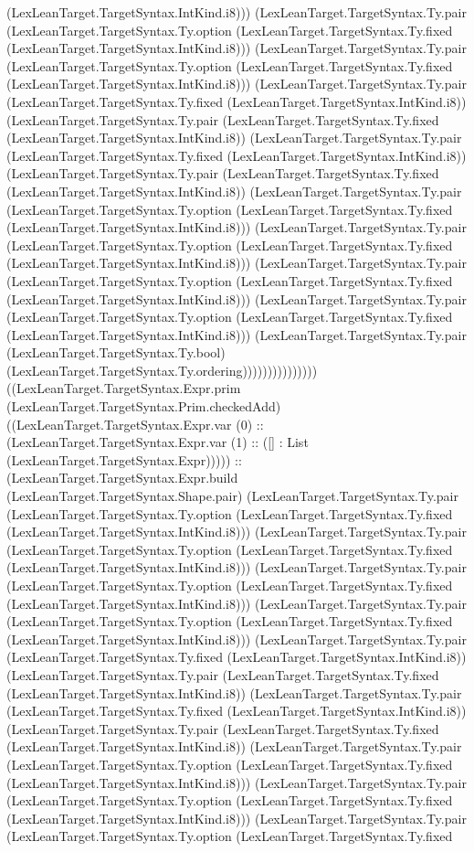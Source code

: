 \documentclass[11pt]{article}
\begin{document}
(LexLeanTarget.TargetSyntax.IntKind.i8))) (LexLeanTarget.TargetSyntax.Ty.pair (LexLeanTarget.TargetSyntax.Ty.option (LexLeanTarget.TargetSyntax.Ty.fixed (LexLeanTarget.TargetSyntax.IntKind.i8))) (LexLeanTarget.TargetSyntax.Ty.pair (LexLeanTarget.TargetSyntax.Ty.option (LexLeanTarget.TargetSyntax.Ty.fixed (LexLeanTarget.TargetSyntax.IntKind.i8))) (LexLeanTarget.TargetSyntax.Ty.pair (LexLeanTarget.TargetSyntax.Ty.fixed (LexLeanTarget.TargetSyntax.IntKind.i8)) (LexLeanTarget.TargetSyntax.Ty.pair (LexLeanTarget.TargetSyntax.Ty.fixed (LexLeanTarget.TargetSyntax.IntKind.i8)) (LexLeanTarget.TargetSyntax.Ty.pair (LexLeanTarget.TargetSyntax.Ty.fixed (LexLeanTarget.TargetSyntax.IntKind.i8)) (LexLeanTarget.TargetSyntax.Ty.pair (LexLeanTarget.TargetSyntax.Ty.fixed (LexLeanTarget.TargetSyntax.IntKind.i8)) (LexLeanTarget.TargetSyntax.Ty.pair (LexLeanTarget.TargetSyntax.Ty.option (LexLeanTarget.TargetSyntax.Ty.fixed (LexLeanTarget.TargetSyntax.IntKind.i8))) (LexLeanTarget.TargetSyntax.Ty.pair (LexLeanTarget.TargetSyntax.Ty.option (LexLeanTarget.TargetSyntax.Ty.fixed (LexLeanTarget.TargetSyntax.IntKind.i8))) (LexLeanTarget.TargetSyntax.Ty.pair (LexLeanTarget.TargetSyntax.Ty.option (LexLeanTarget.TargetSyntax.Ty.fixed (LexLeanTarget.TargetSyntax.IntKind.i8))) (LexLeanTarget.TargetSyntax.Ty.pair (LexLeanTarget.TargetSyntax.Ty.option (LexLeanTarget.TargetSyntax.Ty.fixed (LexLeanTarget.TargetSyntax.IntKind.i8))) (LexLeanTarget.TargetSyntax.Ty.pair (LexLeanTarget.TargetSyntax.Ty.bool) (LexLeanTarget.TargetSyntax.Ty.ordering))))))))))))))) ((LexLeanTarget.TargetSyntax.Expr.prim (LexLeanTarget.TargetSyntax.Prim.checkedAdd) ((LexLeanTarget.TargetSyntax.Expr.var (0) :: (LexLeanTarget.TargetSyntax.Expr.var (1) :: ([] : List (LexLeanTarget.TargetSyntax.Expr))))) :: (LexLeanTarget.TargetSyntax.Expr.build (LexLeanTarget.TargetSyntax.Shape.pair) (LexLeanTarget.TargetSyntax.Ty.pair (LexLeanTarget.TargetSyntax.Ty.option (LexLeanTarget.TargetSyntax.Ty.fixed (LexLeanTarget.TargetSyntax.IntKind.i8))) (LexLeanTarget.TargetSyntax.Ty.pair (LexLeanTarget.TargetSyntax.Ty.option (LexLeanTarget.TargetSyntax.Ty.fixed (LexLeanTarget.TargetSyntax.IntKind.i8))) (LexLeanTarget.TargetSyntax.Ty.pair (LexLeanTarget.TargetSyntax.Ty.option (LexLeanTarget.TargetSyntax.Ty.fixed (LexLeanTarget.TargetSyntax.IntKind.i8))) (LexLeanTarget.TargetSyntax.Ty.pair (LexLeanTarget.TargetSyntax.Ty.option (LexLeanTarget.TargetSyntax.Ty.fixed (LexLeanTarget.TargetSyntax.IntKind.i8))) (LexLeanTarget.TargetSyntax.Ty.pair (LexLeanTarget.TargetSyntax.Ty.fixed (LexLeanTarget.TargetSyntax.IntKind.i8)) (LexLeanTarget.TargetSyntax.Ty.pair (LexLeanTarget.TargetSyntax.Ty.fixed (LexLeanTarget.TargetSyntax.IntKind.i8)) (LexLeanTarget.TargetSyntax.Ty.pair (LexLeanTarget.TargetSyntax.Ty.fixed (LexLeanTarget.TargetSyntax.IntKind.i8)) (LexLeanTarget.TargetSyntax.Ty.pair (LexLeanTarget.TargetSyntax.Ty.fixed (LexLeanTarget.TargetSyntax.IntKind.i8)) (LexLeanTarget.TargetSyntax.Ty.pair (LexLeanTarget.TargetSyntax.Ty.option (LexLeanTarget.TargetSyntax.Ty.fixed (LexLeanTarget.TargetSyntax.IntKind.i8))) (LexLeanTarget.TargetSyntax.Ty.pair (LexLeanTarget.TargetSyntax.Ty.option (LexLeanTarget.TargetSyntax.Ty.fixed (LexLeanTarget.TargetSyntax.IntKind.i8))) (LexLeanTarget.TargetSyntax.Ty.pair (LexLeanTarget.TargetSyntax.Ty.option (LexLeanTarget.TargetSyntax.Ty.fixed 
\end{document}

